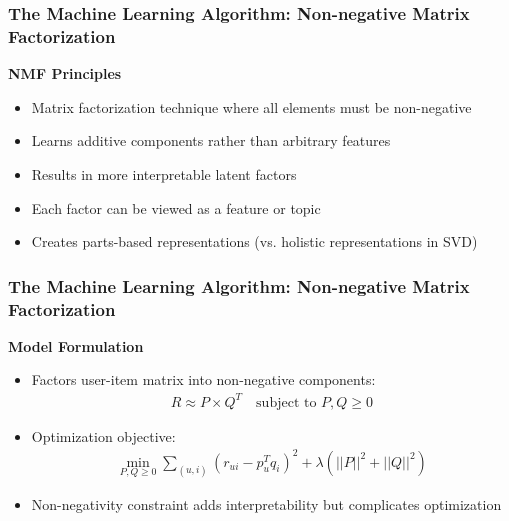 \documentclass{beamer}
\begin{document}
\begin{frame}
\frametitle{The Machine Learning Algorithm: Non-negative Matrix Factorization}

\textbf{NMF Principles}
\begin{itemize}
    \item Matrix factorization technique where all elements must be non-negative
    \item Learns additive components rather than arbitrary features
    \item Results in more interpretable latent factors
    \item Each factor can be viewed as a feature or topic
    \item Creates parts-based representations (vs. holistic representations in SVD)
\end{itemize}
\end{frame}

\begin{frame}
\frametitle{The Machine Learning Algorithm: Non-negative Matrix Factorization}
\textbf{Model Formulation}
\begin{itemize}
    \item Factors user-item matrix into non-negative components:
    \begin{align*}
    R \approx P \times Q^T \quad \text{subject to } P, Q \geq 0
    \end{align*}
    \item Optimization objective:
    \begin{align*}
    \min_{P,Q \geq 0} \sum_{(u,i)} (r_{ui} - p_u^T q_i)^2 + \lambda(||P||^2 + ||Q||^2)
    \end{align*}
    \item Non-negativity constraint adds interpretability but complicates optimization
\end{itemize}
\end{frame}
\end{document}
